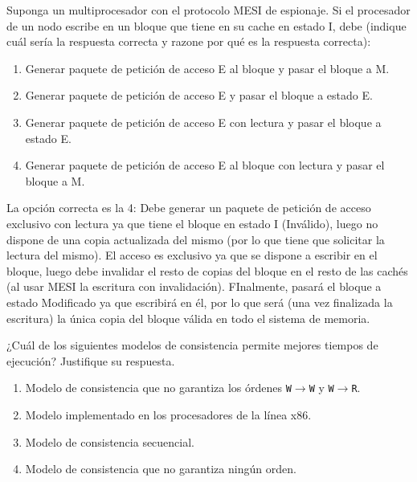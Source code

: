 \begin{cuestion}
    Suponga un multiprocesador con el protocolo MESI de espionaje. Si el procesador de un nodo escribe en un bloque que tiene en su cache en estado I, debe (indique cuál sería la respuesta correcta y razone por qué es la respuesta correcta):
    \begin{enumerate}
        \item Generar paquete de petición de acceso E al bloque y pasar el bloque a M.
        \item Generar paquete de petición de acceso E y pasar el bloque a estado E.
        \item Generar paquete de petición de acceso E con lectura y pasar el bloque a estado E.
        \item Generar paquete de petición de acceso E al bloque con lectura y pasar el bloque a M.
    \end{enumerate}

    La opción correcta es la 4: Debe generar un paquete de petición de acceso exclusivo con lectura ya que tiene el bloque en estado I (Inválido), luego no dispone de una copia actualizada del mismo (por lo que tiene que solicitar la lectura del mismo). El acceso es exclusivo ya que se dispone a escribir en el bloque, luego debe invalidar el resto de copias del bloque en el resto de las cachés (al usar MESI la escritura con invalidación). FInalmente, pasará el bloque a estado Modificado ya que escribirá en él, por lo que será (una vez finalizada la escritura) la única copia del bloque válida en todo el sistema de memoria.
\end{cuestion}

\begin{cuestion}
    ¿Cuál de los siguientes modelos de consistencia permite mejores tiempos de ejecución?
    Justifique su respuesta.
    \begin{enumerate}
        \item Modelo de consistencia que no garantiza los órdenes \verb|W|$\to$\verb|W| y \verb|W|$\to$\verb|R|.
        \item Modelo implementado en los procesadores de la línea x86.
        \item Modelo de consistencia secuencial.
        \item Modelo de consistencia que no garantiza ningún orden.
    \end{enumerate}
\end{cuestion}

